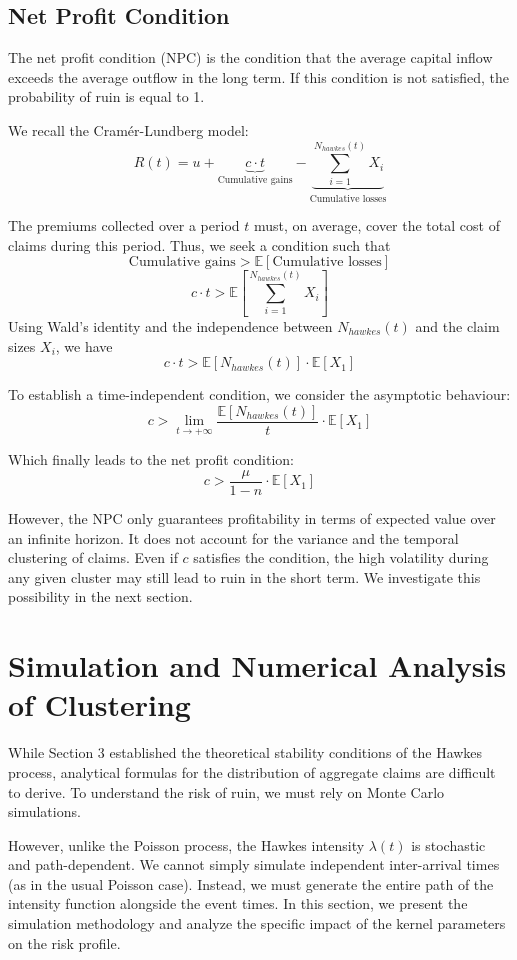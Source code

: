 \documentclass[a4paper,11pt]{article}
\begin{document}
\subsection{Net Profit Condition}

The net profit condition (NPC) is the condition that the average capital inflow exceeds the average outflow in the long term. If this condition is not satisfied, the probability of ruin is equal to 1.

We recall the Cramér-Lundberg model:
$$R(t) = u + \underbrace{c \cdot t}_{\text{Cumulative gains}} - \underbrace{\sum_{i=1}^{N_{hawkes}(t)} X_i}_{\text{Cumulative losses}}$$

The premiums collected over a period $t$ must, on average, cover the total cost of claims during this period. Thus, we seek a condition such that
$$ \text{Cumulative gains} > \mathbb{E}[\text{Cumulative losses}]$$
$$ c \cdot t > \mathbb{E}\left[\sum_{i=1}^{N_{hawkes}(t)} X_i\right]$$
Using Wald's identity and the independence between $N_{hawkes}(t)$ and the claim sizes $X_i$, we have
$$ c \cdot t > \mathbb{E}[N_{hawkes}(t)] \cdot \mathbb{E}[X_1]$$

To establish a time-independent condition, we consider the asymptotic behaviour:
$$ c > \lim_{t \to +\infty} \frac{\mathbb{E}[N_{hawkes}(t)]}{t} \cdot \mathbb{E}[X_1] $$

Which finally leads to the net profit condition:
$$\boxed{c > \frac{\mu}{1-n} \cdot \mathbb{E}[X_1]}$$

However, the NPC only guarantees profitability in terms of expected value over an infinite horizon. It does not account for the variance and the temporal clustering of claims. Even if $c$ satisfies the condition, the high volatility during any given cluster may still lead to ruin in the short term. We investigate this possibility in the next section.


\clearpage
\section{Simulation and Numerical Analysis of Clustering}

While Section 3 established the theoretical stability conditions of the Hawkes process, analytical formulas for the distribution of aggregate claims are difficult to derive. To understand the risk of ruin, we must rely on Monte Carlo simulations.

However, unlike the Poisson process, the Hawkes intensity $\lambda(t)$ is stochastic and path-dependent. We cannot simply simulate independent inter-arrival times (as in the usual Poisson case). Instead, we must generate the entire path of the intensity function alongside the event times. In this section, we present the simulation methodology and analyze the specific impact of the kernel parameters on the risk profile.
\end{document}
